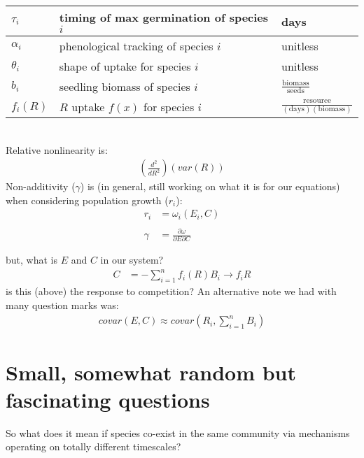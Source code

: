 \documentclass[11pt,a4paper,oneside]{article}
\begin{document}
\begin{center}
\begin{table}[h!]
\begin{tabular}{ | p{3.0cm} | p{6.0cm} | p{4.0cm} |}
\(\tau_{i}\) & timing of max germination of species \(i\) & days \\ \hline
\(\alpha_{i}\) & phenological tracking of species \(i\) & unitless \\ \hline
\(\theta_{i}\) & shape of uptake for species \(i\) & unitless\\ \hline
\hline
\(b_{i}\) & seedling biomass of species \(i\) & \(\frac{\text{biomass}}{\text{seeds}}\) \\ \hline
\(f_{i}(R)\) & \(R\) uptake \(f(x)\) for species \(i\) & \(\frac{\text{resource}}{(\text{days})(\text{biomass})}\)\\
\hline
\end{tabular}
\end{table}
\end{center}


\newpage
{}\\
\noindent Relative nonlinearity is:
\begin{align*}
\left(\frac{d^{2}}{dR^{2}}\right)(var(R))
\end{align*}
\noindent Non-additivity (\(\gamma\)) is (in general, still working on
what it is for our equations) when considering population growth
(\(r_{i}\)):
\begin{align*}
r_{i} & = \omega_{i}(E_{i}, C)
\\
\\
\gamma & = \frac{\partial \omega}{\partial E \partial C} 
\end{align*}

\noindent but, what is \(E\) and \(C\) in our system?
\begin{align*}
C & = - \sum_{i=1}^{n}f_{i}(R)B_{i} \rightarrow f_{i}R
\end{align*}
\noindent is this (above) the response to
  competition? An alternative note we had with many question marks
  was:
\begin{align*}
covar(E,C) \approx covar\left(R_{i}, \sum_{i=1}^{n}B_{i}\right)
\end{align*}

\newpage




\newpage
\section{Small, somewhat random but fascinating questions} 
\noindent So what does it mean if species co-exist in the same community via mechanisms operating on totally different timescales?\\
\end{document}
